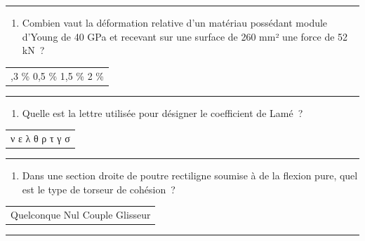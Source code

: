\begin{center}\rule{0.5\linewidth}{0.5pt}\end{center}

\begin{enumerate}
\def\labelenumi{\arabic{enumi}.}
\setcounter{enumi}{12}
\tightlist
\item
  Combien vaut la déformation relative d'un matériau possédant module d'Young de 40 GPa et recevant sur une surface de 260 mm² une force de 52 kN~?
\end{enumerate}

\begin{longtable}[]{@{}l@{}}
\toprule\noalign{}
\endhead
\bottomrule\noalign{}
\endlastfoot
0,3 \% 0,5 \% 1,5 \% 2 \% \\
\end{longtable}

\begin{center}\rule{0.5\linewidth}{0.5pt}\end{center}

\begin{enumerate}
\def\labelenumi{\arabic{enumi}.}
\setcounter{enumi}{13}
\tightlist
\item
  Quelle est la lettre utilisée pour désigner le coefficient de Lamé~?
\end{enumerate}

\begin{longtable}[]{@{}l@{}}
\toprule\noalign{}
\endhead
\bottomrule\noalign{}
\endlastfoot
ν ε λ θ ρ τ γ σ \\
\end{longtable}

\begin{center}\rule{0.5\linewidth}{0.5pt}\end{center}

\begin{enumerate}
\def\labelenumi{\arabic{enumi}.}
\setcounter{enumi}{14}
\tightlist
\item
  Dans une section droite de poutre rectiligne soumise à de la flexion pure, quel est le type de torseur de cohésion~?
\end{enumerate}

\begin{longtable}[]{@{}l@{}}
\toprule\noalign{}
\endhead
\bottomrule\noalign{}
\endlastfoot
Quelconque Nul Couple Glisseur \\
\end{longtable}

\begin{center}\rule{0.5\linewidth}{0.5pt}\end{center}

